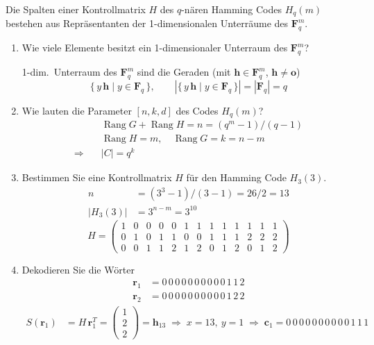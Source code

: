 \begin{loesung}
Die Spalten einer Kontrollmatrix $H$ des $q$-nären Hamming Codes $H_q(m)$ bestehen aus Repräsentanten der 1-dimensionalen Unterräume des $\mathbf{F}_q^m$.
\begin{enumerate}[label=\alph*)]
\item Wie viele Elemente besitzt ein 1-dimensionaler Unterraum des $\mathbf{F}_q^m$?

1-dim.\ Unterraum des $\mathbf{F}_q^m$ sind die Geraden (mit $\mathbf{h} \in \mathbf{F}_q^m$, $\mathbf{h} \ne \mathbf{o}$)
\[
\{\, y\,\mathbf{h} \mid y \in \mathbf{F}_q \,\}, \qquad |\{\, y\,\mathbf{h} \mid y \in \mathbf{F}_q \,\}| = |\mathbf{F}_q| = q
\]
\item Wie lauten die Parameter $[n, k, d]$ des Codes $H_q(m)$?
\begin{align*}
& \operatorname{Rang} G + \operatorname{Rang} H = n = (q^m - 1)/(q-1)\\
& \operatorname{Rang} H = m, \quad \operatorname{Rang} G = k = n - m\\
\Rightarrow\quad & |C| = q^k
\end{align*}
\item Bestimmen Sie eine Kontrollmatrix $H$ für den Hamming Code $H_3(3)$.
\begin{align*}
n &= (3^3 - 1)/(3-1) = 26/2 = 13\\
|H_3(3)| &= 3^{n-m} = 3^{10}
\end{align*}
\[
H =
\begin{pmatrix}
1 & 0 & 0 & 0 & 0 & 1 & 1 & 1 & 1 & 1 & 1 & 1 & 1\\
0 & 1 & 0 & 1 & 1 & 0 & 0 & 1 & 1 & 1 & 2 & 2 & 2\\
0 & 0 & 1 & 1 & 2 & 1 & 2 & 0 & 1 & 2 & 0 & 1 & 2
\end{pmatrix}
\]
\item Dekodieren Sie die Wörter
\begin{align*}
\mathbf{r}_1 &= 0\,0\,0\,0\,0\,0\,0\,0\,0\,0\,1\,1\,2\\
\mathbf{r}_2 &= 0\,0\,0\,0\,0\,0\,0\,0\,0\,0\,1\,2\,2
\end{align*}
\begin{align*}
S(\mathbf{r}_1) &= H\,\mathbf{r}_1^T = \begin{pmatrix} 1\\ 2\\ 2 \end{pmatrix} = \mathbf{h}_{13}
\;\Rightarrow\; x = 13,\ y = 1 \;\Rightarrow\; \mathbf{c}_1 = 0\,0\,0\,0\,0\,0\,0\,0\,0\,0\,1\,1\,1\\

\end{align*}
\end{enumerate}
\end{loesung}
